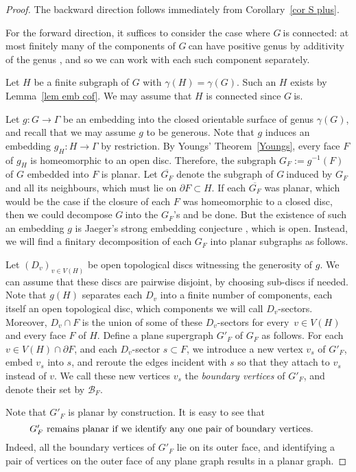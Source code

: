 \documentclass{article}
\newcommand{\defi}[1]{{\color{darkgray}\emph{#1}}}
\newcommand{\cb}{\ensuremath{\mathcal B}}
\newcommand{\cls}[1]{\ensuremath{\overline{#1}}}
\newcommand{\g}{\ensuremath{G\ }}
\newcommand{\Lr}[1]{Lemma~\ref{#1}}
\newcommand{\Tr}[1]{Theorem~\ref{#1}}
\newcommand{\Cr}[1]{Corollary~\ref{#1}}
\newcommand{\fe}{for every}
\newcommand{\labtequ}[2]{\begin{equation} \label{#1} 	\begin{minipage}[c]{0.9\textwidth}  #2 \end{minipage} \ignorespacesafterend \end{equation} }
\begin{document}
\begin{proof}The backward direction follows immediately from \Cr{cor S plus}. 

For the forward direction, it suffices to consider the case where \g is connected: at most finitely many of the components of \g can have positive genus by additivity of the genus \cite{BHKY}, and so we can work with each such component separately. 

Let $H$ be a finite subgraph of $G$ with $\gamma(H)=\gamma(G)$. Such an $H$ exists by \Lr{lem emb cof}. We may assume that $H$ is connected since \g is. 

Let $g: G \to \Gamma$ be an embedding into the closed orientable surface of genus $\gamma(G)$, and recall that we may assume $g$ to be {generous}. Note that $g$ induces an embedding $g_H: H \to \Gamma$ by restriction. By Youngs' \Tr{Youngs}, every face  $F$ of $g_H$ is homeomorphic to an open disc. Therefore, the subgraph $G_F:= g^{-1}(F)$ of $G$ embedded into $F$ is planar. Let $\cls{G_F}$ denote the subgraph of \g induced by $G_F$ and all its neighbours, which must lie on $\partial F \subset H$. If each $\cls{G_F}$ was planar, which would be the case if the closure of each $F$ was homeomorphic to a closed disc, then we could decompose \g into the $G_F$'s and be done. But the existence of such an embedding $g$ is Jaeger's strong embedding conjecture \cite{jaeger}, which is open. Instead, we will find a finitary decomposition of each $G_F$ into planar subgraphs as follows.

Let $(D_v)_{v\in V(H)}$ be open topological discs witnessing the generosity of $g$. We can assume that these discs are pairwise disjoint, by choosing sub-discs if needed. Note that $g(H)$ separates each $D_v$ into a finite number of components, each itself an open topological disc, which components we will call $D_v$-sectors. Moreover, $D_v \cap F$ is the union of some of these $D_v$-sectors \fe\ $v\in V(H)$ and every face $F$ of $H$. Define a plane supergraph $G'_F$ of $G_F$ as follows. For each $v\in V(H) \cap \partial F$, and each $D_v$-sector $s\subset F$, we introduce a new vertex $v_s$ of $G'_F$, embed $v_s$ into $s$, and reroute the edges incident with $s$ so that they attach to $v_s$ instead of $v$. 
We call these new vertices $v_s$ the \defi{boundary vertices} of $G'_F$, and denote their set by $\cb_F$. 

Note that $G'_F$ is planar by construction. It is easy to see that 
\labtequ{identify}{$G'_F$ remains planar if we identify any one pair of boundary vertices.}
Indeed, all the boundary vertices of $G'_F$ lie on its outer face, and identifying a pair of vertices on the outer face of any plane graph results in a planar graph.


\end{proof}
\end{document}
